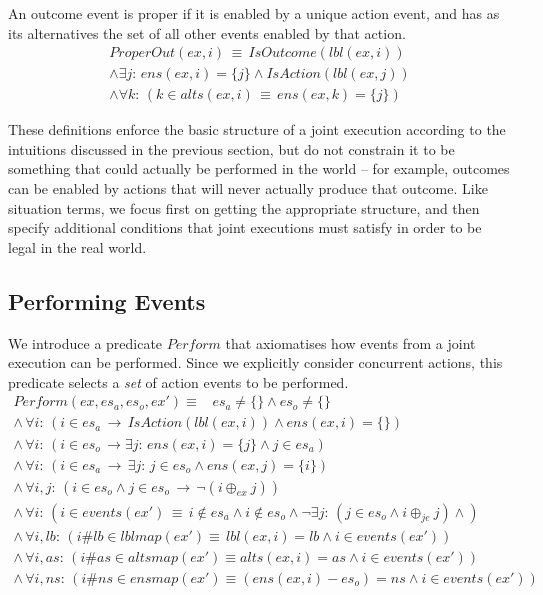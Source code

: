 An outcome event is proper if it is enabled by a unique action event,
and has as its alternatives the set of all other events enabled by
that action.\begin{gather*}
ProperOut(ex,i)\,\equiv\, IsOutcome(lbl(ex,i))\\
\wedge\exists j:\, ens(ex,i)=\{j\}\wedge IsAction(lbl(ex,j))\\
\wedge\forall k:\,\left(k\in alts(ex,i)\,\equiv\, ens(ex,k)=\{j\}\right)\end{gather*}


These definitions enforce the basic structure of a joint execution
according to the intuitions discussed in the previous section, but
do not constrain it to be something that could actually be performed
in the world -- for example, outcomes can be enabled by actions that
will never actually produce that outcome. Like situation terms, we
focus first on getting the appropriate structure, and then specify
additional conditions that joint executions must satisfy in order
to be legal in the real world.


\subsection{Performing Events}

We introduce a predicate $Perform$ that axiomatises how events from
a joint execution can be performed. Since we explicitly consider concurrent
actions, this predicate selects a \emph{set} of action events to be
performed. \begin{gather*}
Perform(ex,es_{a},es_{o},ex')\equiv\,\,\,\,\, es_{a}\neq\{\}\wedge es_{o}\neq\{\}\\
\wedge\,\forall i:\,\left(i\in es_{a}\,\rightarrow\, IsAction(lbl(ex,i))\wedge ens(ex,i)=\{\}\right)\\
\wedge\,\forall i:\,\left(i\in es_{o}\,\rightarrow\exists j:\, ens(ex,i)=\{j\}\wedge j\in es_{a}\right)\\
\wedge\,\forall i:\,\left(i\in es_{a}\,\rightarrow\,\exists j:\, j\in es_{o}\wedge ens(ex,j)=\{i\}\right)\\
\wedge\,\forall i,j:\,\left(i\in es_{o}\wedge j\in es_{o}\,\rightarrow\,\neg(i\oplus_{ex}j)\right)\\
\wedge\,\forall i:\,\left(i\in events(ex')\,\equiv\, i\not\in es_{a}\wedge i\not\in es_{o}\wedge\neg\exists j:\,(j\in es_{o}\wedge i\oplus_{je}j)\wedge\right)\\
\wedge\,\forall i,lb:\,\left(i\#lb\in lblmap(ex')\equiv\, lbl(ex,i)=lb\wedge i\in events(ex')\right)\\
\wedge\,\forall i,as:\,\left(i\#as\in altsmap(ex')\equiv alts(ex,i)=as\wedge i\in events(ex')\right)\\
\wedge\,\forall i,ns:\,\left(i\#ns\in ensmap(ex')\equiv(ens(ex,i)-es_{o})=ns\wedge i\in events(ex')\right)\end{gather*}


